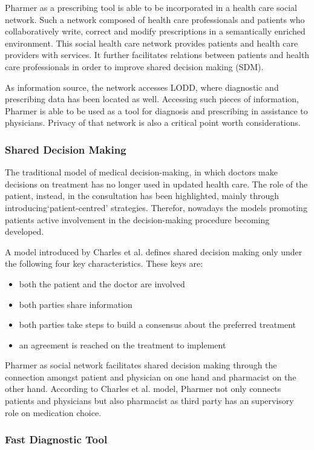 \documentclass[journal]{IEEEtran}
\begin{document}
Pharmer as a prescribing tool is able to be incorporated in a health care social network.
Such a network composed of health care professionals and patients who collaboratively write, correct and modify prescriptions in a semantically enriched environment.
This social health care network provides patients and health care providers with services.
It further facilitates relations between patients and health care professionals in order to improve shared decision making (SDM).

As information source, the network accesses LODD, where diagnostic and prescribing data has been located as well.
Accessing such pieces of information, Pharmer is able to be used as a tool for diagnosis and prescribing in assistance to physicians.
Privacy of that network is also a critical point worth considerations.

\subsubsection{Shared Decision Making}
\label{subsec: SDM}
 The traditional model of medical decision-making, in which doctors make decisions on treatment has no longer used in updated health care.
 The role of the patient, instead, in the consultation has been highlighted, mainly through introducing‘patient-centred’ strategies.
 Therefor, nowadays the models promoting patients active involvement in the decision-making procedure becoming developed.
 
 A model introduced by Charles et al. defines shared decision making only under the following four key characteristics.
 These keys are:
 \begin{itemize}
   \item both the patient and the doctor are involved
   \item both parties share information
   \item both parties take steps to build a consensus about the preferred treatment
   \item an agreement is reached on the treatment to implement
 \end{itemize}

Pharmer as social network facilitates shared decision making through the connection amongst patient and physician on one hand and pharmacist on the other hand. According to Charles et al. model, Pharmer not only connects patients and physicians but also pharmacist as third party has an supervisory role on medication choice.

\subsubsection{Fast Diagnostic Tool}
\end{document}

